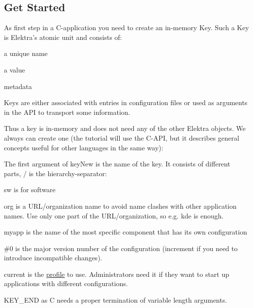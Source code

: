 \subsection*{Get Started}

As first step in a C-\/application you need to create an in-\/memory {\ttfamily Key}. Such a {\ttfamily Key} is Elektra’s atomic unit and consists of\+:


\begin{DoxyItemize}
\item a unique name
\item a value
\item metadata
\end{DoxyItemize}

{\ttfamily Key}s are either associated with entries in configuration files or used as arguments in the A\+PI to transport some information.

Thus a key is in-\/memory and does not need any of the other Elektra objects. We always can create one (the tutorial will use the C-\/\+A\+PI, but it describes general concepts useful for other languages in the same way)\+:





\begin{DoxyItemize}
\item The first argument of {\ttfamily key\+New} is the name of the key. It consists of different parts, {\ttfamily /} is the hierarchy-\/separator\+:
\begin{DoxyItemize}
\item {\ttfamily sw} is for software
\item {\ttfamily org} is a U\+R\+L/organization name to avoid name clashes with other application names. Use only one part of the U\+R\+L/organization, so e.\+g. {\ttfamily kde} is enough.
\item {\ttfamily myapp} is the name of the most specific component that has its own configuration
\item {\ttfamily \#0} is the major version number of the configuration (increment if you need to introduce incompatible changes).
\item {\ttfamily current} is the \hyperlink{md_src_plugins_profile_README_src_plugins_profile_README_md}{profile} to use. Administrators need it if they want to start up applications with different configurations.
\end{DoxyItemize}
\item {\ttfamily K\+E\+Y\+\_\+\+E\+ND} as C needs a proper termination of variable length arguments.
\end{DoxyItemize}

